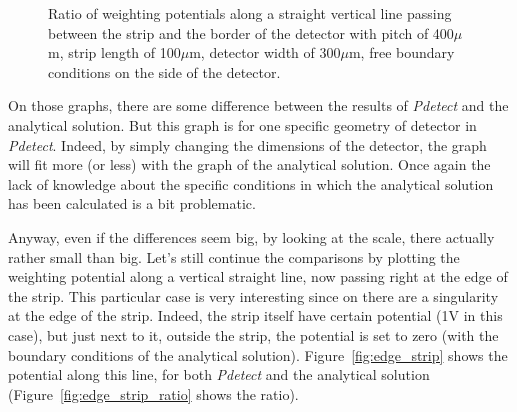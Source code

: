 \documentclass[11pt]{article}
\begin{document}
\begin{figure}[H]
\begin{minipage}[b]{.46\linewidth}
			\caption{Ratio of weighting potentials along a straight vertical line passing between the
					strip and the border of the detector with pitch
					of 400$\mu$m, strip length of 100$\mu$m, detector width of 300$\mu$m, free boundary conditions
					on the side of the detector.}
			\label{fig:mid_pitch_ratio}
		\end{minipage}
	\end{figure}

	On those graphs, there are some difference between the results of \textit{Pdetect} and the
	analytical solution. But this graph is for one specific geometry of detector in \textit{Pdetect}.
	Indeed, by simply changing the dimensions of the detector, the graph will fit more (or less) with
	the graph of the analytical solution. Once again the lack of knowledge about the specific conditions
	in which the analytical solution has been calculated is a bit problematic.

	Anyway, even if the differences seem big, by looking at the scale, there actually rather small
	than big. Let's still continue the comparisons by plotting the weighting potential along
	a vertical straight line, now passing right at the edge of the strip. This particular case
	is very interesting since on there are a singularity at the edge of the strip. Indeed, the
	strip itself have certain potential (1V in this case), but just next to it, outside the strip,
	the potential is set to zero (with the boundary conditions of the analytical solution).
	Figure~\ref{fig:edge_strip} shows the potential along this line, for both \textit{Pdetect}
	and the analytical solution (Figure~\ref{fig:edge_strip_ratio} shows the ratio).
\end{document}
